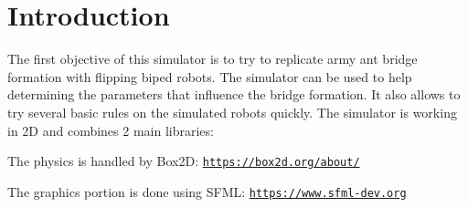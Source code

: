 \hypertarget{index_intro_sec}{}\section{Introduction}\label{index_intro_sec}
The first objective of this simulator is to try to replicate army ant bridge formation with flipping biped robots. The simulator can be used to help determining the parameters that influence the bridge formation. It also allows to try several basic rules on the simulated robots quickly. The simulator is working in 2D and combines 2 main libraries\+:
\begin{DoxyItemize}
\item The physics is handled by Box2D\+: \href{https://box2d.org/about/}{\tt https\+://box2d.\+org/about/}
\item The graphics portion is done using S\+F\+ML\+: \href{https://www.sfml-dev.org}{\tt https\+://www.\+sfml-\/dev.\+org}
\end{DoxyItemize}

